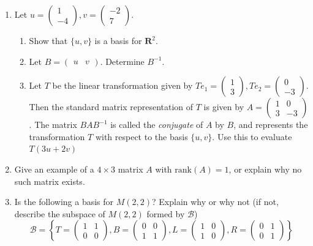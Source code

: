 \documentclass[12pt]{article}
\numberwithin{equation}{subsection}
\numberwithin{figure}{subsection}
\theoremstyle{note}
\newcommand\rank[1]{\mathrm{rank}(#1)}
\begin{document}
\begin{enumerate}[label=\arabic*.]
	\item Let $u=\begin{pmatrix} 1 \\ -4 \end{pmatrix}, v=\begin{pmatrix} -2 \\ 7\end{pmatrix}$.
	\begin{enumerate}
		\item Show that $\{u,v\}$ is a basis for $\mathbf{R}^2$. 
		\item Let $B=\begin{pmatrix} u & v\end{pmatrix}$. Determine $B^{-1}$.
		\item Let $T$ be the linear transformation given by $Te_1=\begin{pmatrix} 1 \\ 3\end{pmatrix}, Te_2=\begin{pmatrix} 0 \\ -3\end{pmatrix}$. Then the standard matrix representation of $T$ is given by $A=\begin{pmatrix} 1 & 0 \\ 3 & -3\end{pmatrix}$. The matrix $BAB^{-1}$ is called the \textit{conjugate} of $A$ by $B$, and represents the transformation $T$ with respect to the basis $\{u,v\}$. Use this to evaluate $T(3u+2v)$
	\end{enumerate}

	\item Give an example of a $4\times 3$ matrix $A$ with $\rank{A}=1$, or explain why no such matrix exists. 

	\item Is the following a basis for $M(2,2)$? Explain why or why not (if not, describe the subspace of $M(2,2)$ formed by $\mathcal{B}$)\[\mathcal{B}= \left\{T= \begin{pmatrix} 1 & 1 \\ 0 & 0 \end{pmatrix}, B=\begin{pmatrix} 0 & 0 \\ 1 & 1 \end{pmatrix}, L=\begin{pmatrix} 1 & 0 \\ 1 & 0 \end{pmatrix}, R=\begin{pmatrix} 0 & 1 \\ 0 & 1 \end{pmatrix}\right\}\] 



\end{enumerate}
\end{document}
